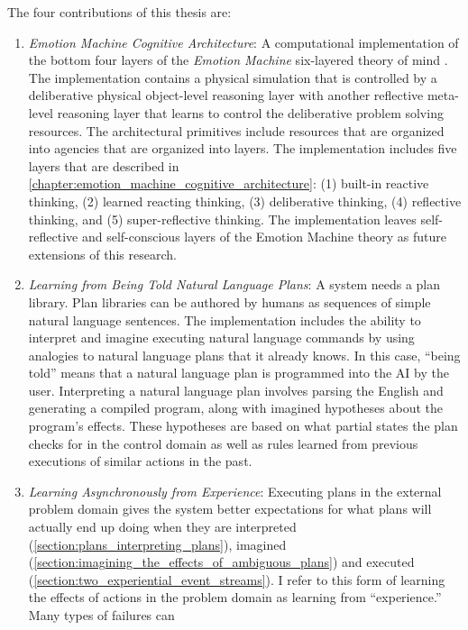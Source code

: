 The four contributions of this thesis are:
\begin{enumerate}
\item \emph{Emotion Machine Cognitive Architecture}: A computational
  implementation of the bottom four layers of the \emph{Emotion
    Machine} six-layered theory of mind \cite[]{minsky:2006}.  The
  implementation contains a physical simulation that is controlled by
  a deliberative physical object-level reasoning layer with another
  reflective meta-level reasoning layer that learns to control the
  deliberative problem solving resources.  The architectural
  primitives include resources that are organized into agencies that
  are organized into layers.  The implementation includes five layers
  that are described in
  {\mbox{\autoref{chapter:emotion_machine_cognitive_architecture}}}:
  (1) built-in reactive thinking, (2) learned reacting thinking, (3)
  deliberative thinking, (4) reflective thinking, and (5)
  super-reflective thinking.  The implementation leaves
  self-reflective and self-conscious layers of the Emotion Machine
  theory as future extensions of this research.
\item \emph{Learning from Being Told Natural Language Plans}: A system
  needs a plan library.  Plan libraries can be authored by humans as
  sequences of simple natural language sentences.  The implementation
  includes the ability to interpret and imagine executing natural
  language commands by using analogies to natural language plans that
  it already knows.  In this case, ``being told'' means that a natural
  language plan is programmed into the AI by the user.  Interpreting a
  natural language plan involves parsing the English and generating a
  compiled program, along with imagined hypotheses about the program's
  effects.  These hypotheses are based on what partial states the plan
  checks for in the control domain as well as rules learned from
  previous executions of similar actions in the past.
\item \emph{Learning Asynchronously from Experience}: Executing plans
  in the external problem domain gives the system better expectations
  for what plans will actually end up doing when they are interpreted
  ({\mbox{\autoref{section:plans_interpreting_plans}}}), imagined
  ({\mbox{\autoref{section:imagining_the_effects_of_ambiguous_plans}}})
  and executed
  ({\mbox{\autoref{section:two_experiential_event_streams}}}).  I
  refer to this form of learning the effects of actions in the problem
  domain as learning from ``experience.''  Many types of failures can

\end{enumerate}
